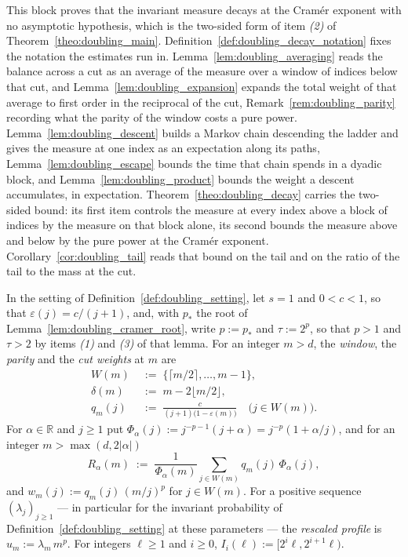 This block proves that the invariant measure decays at the Cram\'er exponent with no asymptotic
hypothesis, which is the two-sided form of item \emph{(2)} of
Theorem~\ref{theo:doubling_main}. Definition~\ref{def:doubling_decay_notation} fixes the
notation the estimates run in. Lemma~\ref{lem:doubling_averaging} reads the balance across a
cut as an average of the measure over a window of indices below that cut, and
Lemma~\ref{lem:doubling_expansion} expands the total weight of that average to first order in
the reciprocal of the cut, Remark~\ref{rem:doubling_parity} recording what the parity of the
window costs a pure power. Lemma~\ref{lem:doubling_descent} builds a Markov chain descending
the ladder and gives the measure at one index as an expectation along its paths,
Lemma~\ref{lem:doubling_escape} bounds the time that chain spends in a dyadic block, and
Lemma~\ref{lem:doubling_product} bounds the weight a descent accumulates, in expectation.
Theorem~\ref{theo:doubling_decay} carries the two-sided bound: its first item controls the
measure at every index above a block of indices by the measure on that block alone, its second
bounds the measure above and below by the pure power at the Cram\'er exponent.
Corollary~\ref{cor:doubling_tail} reads that bound on the tail and on the ratio of the tail to
the mass at the cut.

\begin{definition}\label{def:doubling_decay_notation}
In the setting of Definition~\ref{def:doubling_setting}, let $s=1$ and $0<c<1$, so that
$\varepsilon(j)=c/(j+1)$, and, with $p_*$ the root of Lemma~\ref{lem:doubling_cramer_root},
write $p:=p_*$ and $\tau:=2^{p}$, so that $p>1$ and $\tau>2$ by items \emph{(1)} and
\emph{(3)} of that lemma. For an
integer $m>d$, the \emph{window}, the \emph{parity} and the \emph{cut weights} at $m$ are
\begin{equation}\label{eq:doubling_window}
\begin{aligned}
    W(m)\;&:=\;\{\lceil m/2\rceil,\dots,m-1\},\\
    \delta(m)\;&:=\;m-2\lfloor m/2\rfloor,\\
    q_m(j)\;&:=\;\frac{c}{(j+1)\bigl(1-\varepsilon(m)\bigr)}\quad\bigl(j\in W(m)\bigr).
\end{aligned}
\end{equation}
For $\alpha\in\mathbb R$ and $j\geq1$ put $\Phi_\alpha(j):=j^{-p-1}(j+\alpha)=j^{-p}(1+\alpha/j)$,
and for an integer $m>\max(d,2|\alpha|)$
\begin{equation}\label{eq:doubling_R}
    R_\alpha(m)\;:=\;\frac{1}{\Phi_\alpha(m)}\sum_{j\in W(m)}q_m(j)\,\Phi_\alpha(j),
\end{equation}
and $w_m(j):=q_m(j)\,(m/j)^{p}$ for $j\in W(m)$. For a positive sequence
$(\lambda_j)_{j\geq1}$ --- in particular for the invariant probability of
Definition~\ref{def:doubling_setting} at these parameters --- the
\emph{rescaled profile} is $u_m:=\lambda_m\,m^{p}$. For integers $\ell\geq1$ and $i\geq0$,
$I_i(\ell):=[2^{i}\ell,2^{i+1}\ell)$.
\end{definition}

